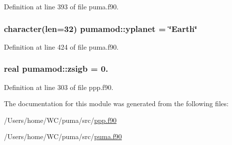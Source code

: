\-Definition at line 393 of file puma.\-f90.

\hypertarget{classpumamod_a903a55d5d849abb77aa4ccb8534add13}{
\subsubsection[{yplanet}]{\setlength{\rightskip}{0pt plus 5cm}character(len=32) {\bf pumamod\-::yplanet} = \char`\"{}\-Earth\char`\"{}}}
\label{classpumamod_a903a55d5d849abb77aa4ccb8534add13}


\-Definition at line 424 of file puma.\-f90.

\hypertarget{classpumamod_ad8b8310adc7cc23bb372abec1bb098b5}{
\subsubsection[{zsigb}]{\setlength{\rightskip}{0pt plus 5cm}real {\bf pumamod\-::zsigb} = 0.}}
\label{classpumamod_ad8b8310adc7cc23bb372abec1bb098b5}


\-Definition at line 303 of file ppp.\-f90.



\-The documentation for this module was generated from the following files\-:\begin{DoxyCompactItemize}
\item 
/\-Users/home/\-W\-C/puma/src/\hyperlink{ppp_8f90}{ppp.\-f90}\item 
/\-Users/home/\-W\-C/puma/src/\hyperlink{puma_8f90}{puma.\-f90}\end{DoxyCompactItemize}
